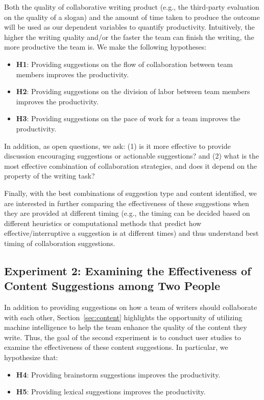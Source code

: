 Both the quality of collaborative writing product (e.g., the third-party evaluation on the quality of a slogan) and the amount of time taken to produce the outcome will be used as our dependent variables to quantify productivity. Intuitively, the higher the writing quality and/or the faster the team can finish the writing, the more productive the team is. 
We make the following hypotheses:
\begin{itemize}[leftmargin=*,noitemsep,topsep=0pt,parsep=0pt,partopsep=0pt]
\item{\bf H1}: Providing suggestions on the flow of collaboration between team members improves the productivity.
\item{\bf H2}: Providing suggestions on the division of labor between team members improves the productivity.
\item{\bf H3}: Providing suggestions on the pace of work for a team improves the productivity.
\end{itemize}
In addition, as open questions, we ask: (1) is it more effective to provide discussion encouraging suggestions or actionable suggestions? and (2) what is the most effective combination of collaboration strategies, and does it depend on the property of the writing task?

Finally, with the best combinations of suggestion type and content identified, we are interested in further comparing the effectiveness of these suggestions when they are provided at different timing (e.g., the timing can be decided based on different heuristics or computational methods that predict how effective/interruptive a suggestion is at different times) and thus understand best timing of collaboration suggestions.

\subsection{Experiment 2: Examining the Effectiveness of Content Suggestions among Two People}
\label{sec:exp2}
In addition to providing suggestions on how a team of writers should collaborate with each other, Section~\ref{sec:content} highlights the opportunity of utilizing machine intelligence to help the team enhance the quality of the content they write. Thus, the goal of the second experiment is 
to conduct user studies to examine the effectiveness of these content suggestions.
In particular, we hypothesize that:
\begin{itemize}[leftmargin=*,noitemsep,topsep=0pt,parsep=0pt,partopsep=0pt]
\item{\bf H4}: Providing brainstorm suggestions improves the productivity.
\item{\bf H5}: Providing lexical suggestions improves the productivity.
\end{itemize}

